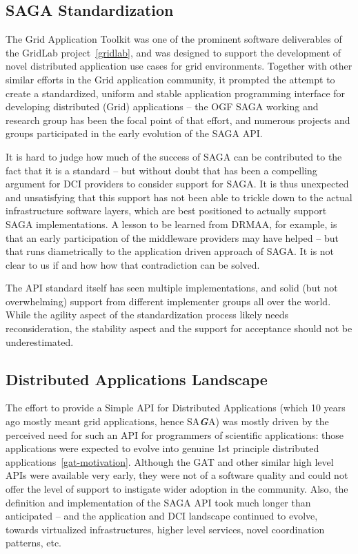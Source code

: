 \documentclass{article}
\newcommand{\BI}[1]{\textbf{\textit{#1}}}
\begin{document}
 \subsection{SAGA Standardization}

  The Grid Application Toolkit was one of the prominent software
  deliverables of the GridLab project~\ref{gridlab}, and was designed
  to support the development of novel distributed application use
  cases for grid environments.  Together with other similar efforts in
  the Grid application community, it prompted the attempt to create
  a standardized, uniform and stable application programming interface
  for developing distributed (Grid) applications -- the OGF SAGA
  working and research group has been the focal point of that effort,
  and numerous projects and groups participated in the early
  evolution of the SAGA API.  

  It is hard to judge how much of the success of SAGA can be
  contributed to the fact that it is a standard -- but without doubt
  that has been a compelling argument for DCI providers to consider
  support for SAGA.  It is thus unexpected and unsatisfying that this
  support has not been able to trickle down to the actual
  infrastructure software layers, which are best positioned to
  actually support SAGA implementations.  A lesson to be learned from
  DRMAA, for example, is that an early participation of the middleware
  providers may have helped -- but that runs diametrically to the
  application driven approach of SAGA.  It is not clear to us if and
  how how that contradiction can be solved.

  The API standard itself has seen multiple implementations, and solid
  (but not overwhelming) support from different implementer groups all
  over the world.  While the agility aspect of the standardization
  process likely needs reconsideration, the stability aspect and the
  support for acceptance should not be underestimated.


 \subsection{Distributed Applications Landscape}

  The effort to provide a Simple API for Distributed Applications
  (which 10 years ago mostly meant grid applications, hence SA\BI{G}A)
  was mostly driven by the perceived need for such an API for
  programmers of scientific applications: those applications were
  expected to evolve into genuine 1st principle distributed
  applications~\ref{gat-motivation}.  Although the GAT and other
  similar high level APIs were available very early, they were not of
  a software quality and could not offer the level of support to
  instigate wider adoption in the community.  Also, the definition and
  implementation of the SAGA API took much longer than anticipated --
  and the application and DCI landscape continued to evolve, towards
  virtualized infrastructures, higher level services, novel
  coordination patterns, etc.
  
\end{document}
